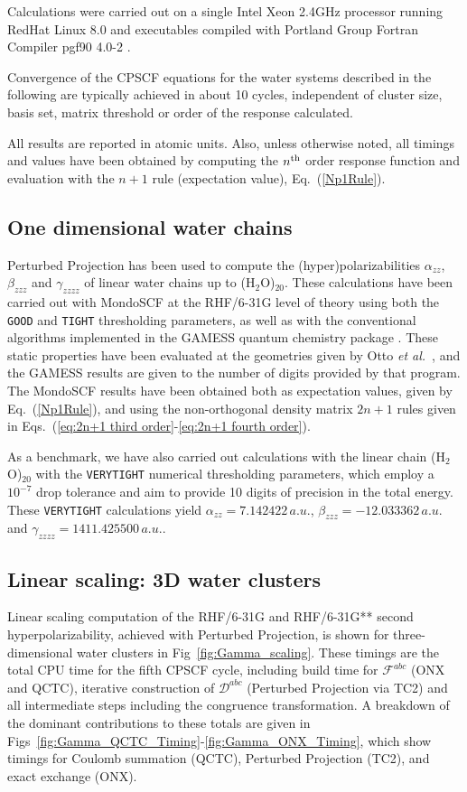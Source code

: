 \documentclass[prl,twocolumn,showpacs,twocolumngrid,superbib]{revtex4}
\def\F{\mathcal{F}}
\def\D{\mathcal{D}}
\begin{document}
Calculations were carried out on a single Intel Xeon 2.4GHz processor running RedHat Linux 8.0 and  
executables compiled with Portland Group Fortran Compiler pgf90 4.0-2 \cite{PGF90}.

Convergence of the CPSCF equations for the water systems described in the following 
are typically achieved in about 10 cycles, independent of cluster size, basis set,
matrix threshold or order of the response calculated.

All results are reported in atomic units.  Also, unless otherwise noted, all timings and values 
have been obtained by computing the $n^{\rm th}$ order response function and evaluation with the
$n+1$ rule (expectation value), Eq.~(\ref{Np1Rule}).
\subsection{One dimensional water chains}

Perturbed Projection has been used to compute the (hyper)polarizabilities $\alpha_{zz}$, 
$\beta_{zzz}$ and $\gamma_{zzzz}$ of linear water chains up to (H$_2$O)$_{20}$. 
These calculations have been carried out with {\sc MondoSCF} at the RHF/6-31G level of theory using 
both the {\tt GOOD} and {\tt TIGHT} thresholding parameters,  as well as with the conventional algorithms implemented
in the {\sc GAMESS} quantum chemistry package \cite{gamess}.  These static properties have 
been evaluated at the geometries given by Otto {\em et al.}~\cite{POtto99}, and the GAMESS
results are given to the number of digits provided by that program.
The {\sc MondoSCF} results have been obtained both as expectation values, given by Eq.~(\ref{Np1Rule}), 
and using the non-orthogonal density matrix $2 n+1$ rules given in 
Eqs.~(\ref{eq:2n+1 third order}-\ref{eq:2n+1 fourth order}).

As a benchmark, we have also carried out calculations with the linear chain (H$_2$O)$_{20}$ with 
the {\tt VERYTIGHT} numerical thresholding parameters, which employ a $10^{-7}$ drop tolerance and
aim to provide 10 digits of precision in the total energy.   These {\tt VERYTIGHT} calculations yield  
$\alpha_{zz}=7.142422\,a.u.$, $\beta_{zzz}=-12.033362\,a.u.$ and $\gamma_{zzzz}=1411.425500\,a.u.$. 

\subsection{Linear scaling: 3D water clusters}

Linear scaling computation of the RHF/6-31G and RHF/6-31G** second hyperpolarizability,
achieved with Perturbed Projection, is shown for three-dimensional water clusters 
in Fig~\ref{fig:Gamma_scaling}.  These timings are the total CPU time for the fifth CPSCF cycle, 
including build time for $\F^{abc}$ ({\sc ONX} and {\sc QCTC}), 
iterative construction of $\D^{abc}$ (Perturbed Projection via {\sc TC2}) and all intermediate
steps including the congruence transformation.
A breakdown of the dominant contributions to these totals are given
in Figs~\ref{fig:Gamma_QCTC_Timing}-\ref{fig:Gamma_ONX_Timing}, which show timings for Coulomb 
summation ({\sc QCTC}), Perturbed Projection ({\sc TC2}), and exact exchange ({\sc ONX}).
\end{document}
